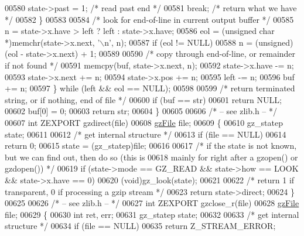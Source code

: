 \begin{DoxyCode}
00580             state->past = 1;            \textcolor{comment}{/* read past end */}
00581             \textcolor{keywordflow}{break};                      \textcolor{comment}{/* return what we have */}
00582         \}
00583 
00584         \textcolor{comment}{/* look for end-of-line in current output buffer */}
00585         n = state->x.have > left ? left : state->x.have;
00586         eol = (\textcolor{keywordtype}{unsigned} \textcolor{keywordtype}{char} *)memchr(state->x.next, \textcolor{charliteral}{'\(\backslash\)n'}, n);
00587         \textcolor{keywordflow}{if} (eol != NULL)
00588             n = (unsigned)(eol - state->x.next) + 1;
00589 
00590         \textcolor{comment}{/* copy through end-of-line, or remainder if not found */}
00591         memcpy(buf, state->x.next, n);
00592         state->x.have -= n;
00593         state->x.next += n;
00594         state->x.pos += n;
00595         left -= n;
00596         buf += n;
00597     \} \textcolor{keywordflow}{while} (left && eol == NULL);
00598 
00599     \textcolor{comment}{/* return terminated string, or if nothing, end of file */}
00600     \textcolor{keywordflow}{if} (buf == str)
00601         \textcolor{keywordflow}{return} NULL;
00602     buf[0] = 0;
00603     \textcolor{keywordflow}{return} str;
00604 \}
00605 
00606 \textcolor{comment}{/* -- see zlib.h -- */}
00607 \textcolor{keywordtype}{int} ZEXPORT gzdirect(file)
00608     \hyperlink{structgz_file__s}{gzFile} file;
00609 \{
00610     gz\_statep state;
00611 
00612     \textcolor{comment}{/* get internal structure */}
00613     \textcolor{keywordflow}{if} (file == NULL)
00614         \textcolor{keywordflow}{return} 0;
00615     state = (gz\_statep)file;
00616 
00617     \textcolor{comment}{/* if the state is not known, but we can find out, then do so (this is}
00618 \textcolor{comment}{       mainly for right after a gzopen() or gzdopen()) */}
00619     \textcolor{keywordflow}{if} (state->mode == GZ\_READ && state->how == LOOK && state->x.have == 0)
00620         (void)gz\_look(state);
00621 
00622     \textcolor{comment}{/* return 1 if transparent, 0 if processing a gzip stream */}
00623     \textcolor{keywordflow}{return} state->direct;
00624 \}
00625 
00626 \textcolor{comment}{/* -- see zlib.h -- */}
00627 \textcolor{keywordtype}{int} ZEXPORT gzclose\_r(file)
00628     \hyperlink{structgz_file__s}{gzFile} file;
00629 \{
00630     \textcolor{keywordtype}{int} ret, err;
00631     gz\_statep state;
00632 
00633     \textcolor{comment}{/* get internal structure */}
00634     \textcolor{keywordflow}{if} (file == NULL)
00635         \textcolor{keywordflow}{return} Z\_STREAM\_ERROR;

\end{DoxyCode}
